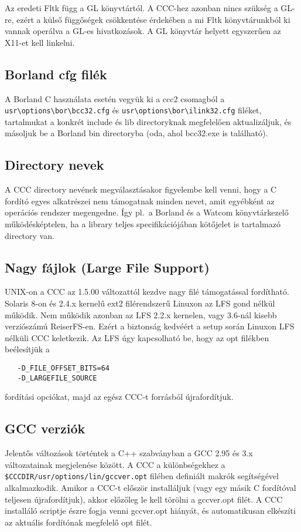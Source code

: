 Az eredeti Fltk függ a GL könyvtártól.
A CCC-hez azonban nincs szükség a GL-re,
ezért a külső függőségek csökkentése érdekében
a mi Fltk könyvtárunkból ki vannak operálva a GL-es hivatkozások. 
A GL könyvtár helyett egyszerűen az X11-et kell linkelni.


\subsection{Borland cfg filék} 
A Borland C használata esetén vegyük ki a ccc2 csomagból a
   \verb'usr\options\bor\bcc32.cfg' és
   \verb'usr\options\bor\ilink32.cfg' filéket,
   tartalmukat a konkrét include és lib directoryknak megfelelően 
   aktualizáljuk, és másoljuk be a Borland bin directoryba 
   (oda, ahol bcc32.exe is található). 

\subsection{Directory nevek} 

A CCC directory nevének megválasztásakor figyelembe kell venni,
hogy a C fordító egyes alkatrészei nem támogatnak minden nevet, 
amit egyébként az operációs rendszer megengedne. Így pl.\ a Borland
és a Watcom könyvtárkezelő működésképtelen, ha a library teljes
specifikációjában kötőjelet is tartalmazó directory van. 

\subsection{Nagy fájlok (Large File Support)} 

UNIX-on a CCC az 1.5.00 változattól kezdve nagy filé támogatással
fordítható. Solaris 8-on és 2.4.x kernelű ext2 filérendszerű Linuxon
az LFS gond nélkül működik. Nem működik azonban az LFS 2.2.x kernelen,
vagy 3.6-nál kisebb verziószámú ReiserFS-en. Ezért a biztonság
kedvéért a setup során Linuxon LFS nélküli CCC keletkezik.
Az LFS úgy kapcsolható be, hogy az opt filékben beélesítjük a

\begin{verbatim}
   -D_FILE_OFFSET_BITS=64
   -D_LARGEFILE_SOURCE
\end{verbatim}

fordítási opciókat, majd az egész CCC-t forrásból újrafordítjuk.
 

\subsection{GCC verziók}

Jelentős változások történtek a C++ szabványban
a GCC 2.95 és 3.x változatainak megjelenése között.
A CCC a különbségekhez a \verb!$CCCDIR/usr/options/lin/gccver.opt! 
filében definiált makrók segítségével alkalmazkodik.
Amikor a CCC-t először installáljuk (vagy egy másik C fordítóval
teljesen újrafordítjuk), akkor előzőleg le kell törölni a
gccver.opt filét. A CCC installáló scriptje észre fogja venni
gccver.opt hiányát, és automatikusan elkészíti az aktuális
fordítónak megfelelő opt filét. 

